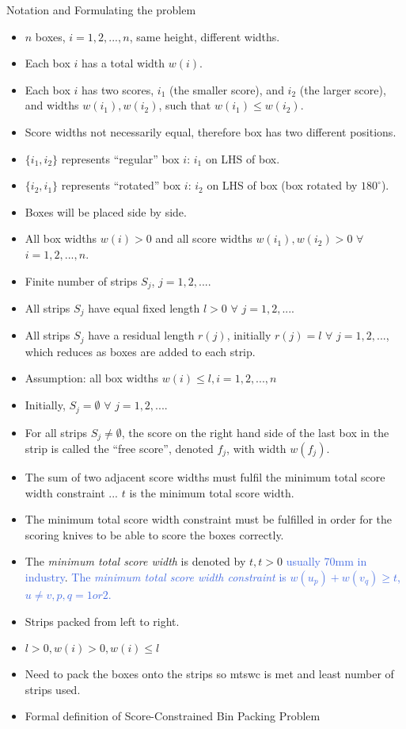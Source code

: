 \documentclass{llncs}
\begin{document}
Notation and Formulating the problem
\begin{itemize}
	\item $n$ boxes, $i = 1, 2, ..., n$, same height, different widths.
	\item Each box $i$ has a total width $w(i)$.
	\item Each box $i$ has two scores, $i_1$ (the smaller score), and $i_2$ (the larger score), and widths $w(i_1), w(i_2)$, such that $w(i_1) \leq w(i_2)$.
	\item Score widths not necessarily equal, therefore box has two different positions.
	\item $\{i_1, i_2\}$ represents ``regular'' box $i$: $i_1$ on LHS of box.
	\item $\{i_2, i_1\}$ represents ``rotated'' box $i$: $i_2$ on LHS of box (box rotated by $180^{\circ}$).
	\item Boxes will be placed side by side.
	\item All box widths $w(i) > 0$ and all score widths $w(i_1), w(i_2) > 0$ $\forall$ $i = 1, 2, ..., n$.
	\item Finite number of strips $S_j$, $j = 1, 2, ...$.
	\item All strips $S_j$ have equal fixed length $l > 0$ $\forall$ $j = 1, 2, ...$.
	\item All strips $S_j$ have a residual length $r(j)$, initially $r(j) = l$ $\forall$ $j = 1,2, ...$, which reduces as boxes are added to each strip.
	\item Assumption: all box widths $w(i) \leq l, i = 1, 2, ..., n$
	\item Initially, $S_j = \emptyset$ $\forall$ $j = 1, 2, ...$.
	\item For all strips $S_j \neq \emptyset$, the score on the right hand side of the last box in the strip is called the ``free score'', denoted $f_j$, with width $w(f_j)$.
	\item The sum of two adjacent score widths must fulfil the minimum total score width constraint ... $t$ is the minimum total score width.
	\item The minimum total score width constraint must be fulfilled in order for the scoring knives to be able to score the boxes correctly.
	\item The \textit{minimum total score width} is denoted by $t, t > 0$ \textcolor{RoyalBlue}{usually 70mm in industry}. \textcolor{RoyalBlue}{The \textit{minimum total score width constraint} is $w(u_p) + w(v_q) \geq t$, $u \neq v, p, q = 1 or 2$.}
	\item Strips packed from left to right.
	\item $l > 0, w(i) > 0, w(i) \leq l$
	\item Need to pack the boxes onto the strips so mtswc is met and least number of strips used.
	\item Formal definition of Score-Constrained Bin Packing Problem
\end{itemize}
\end{document}
